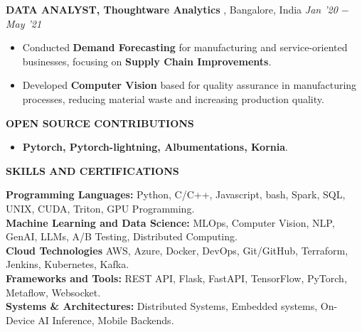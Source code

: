 \documentclass[10pt,a4]{article}
\begin{document}
{\begin{flushleft}
    \textbf{\large DATA ANALYST, Thoughtware Analytics },  Bangalore, India \hfill \textit{\large Jan '20 $-$ May '21}	\\		
    \begin{itemize}
          
        \item Conducted \textbf{Demand Forecasting} for manufacturing and service-oriented businesses, focusing on \textbf{Supply Chain Improvements}.
        \item Developed \textbf{Computer Vision} based for quality assurance in manufacturing processes, reducing material waste and increasing production quality.   
    \end{itemize}
    
\end{flushleft}

\begin{flushleft}
    \textbf{\large OPEN SOURCE CONTRIBUTIONS}
    \begin{itemize}
        \item \textbf{Pytorch, Pytorch-lightning, Albumentations, Kornia}.
    \end{itemize}
\end{flushleft}



\begin{flushleft}
    {\large \textbf {SKILLS AND CERTIFICATIONS}}
    
        \vspace{1mm}
            \hspace{0.5cm}  \textbf{Programming Languages:} Python, C/C++, Javascript, bash, Spark, SQL, UNIX, CUDA, Triton, GPU Programming. \\
            \hspace{0.5cm}  \textbf{Machine Learning and Data Science:} MLOps, Computer Vision, NLP, GenAI, LLMs, A/B Testing, Distributed Computing. \\
            \hspace{0.5cm}  \textbf{Cloud Technologies} AWS, Azure, Docker, DevOps, Git/GitHub, Terraform, Jenkins, Kubernetes, Kafka. \\
            \hspace{0.5cm}  \textbf{Frameworks and Tools:} REST API, Flask, FastAPI, TensorFlow, PyTorch, Metaflow, Websocket. \\
            \hspace{0.5cm}  \textbf{Systems \& Architectures:} Distributed Systems, Embedded systems, On-Device AI Inference, Mobile Backends.


\end{flushleft}}
\end{document}
